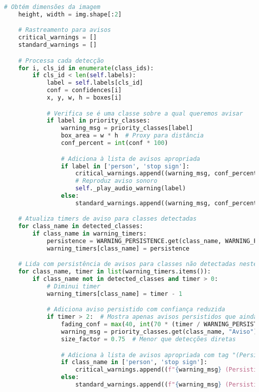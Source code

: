 \documentclass[
	12pt,				%
	oneside, %
	a4paper,			%
	english,			%
	french,				%
	spanish,			%
	brazil				%
	]{abntex2}
\begin{document}
\begin{apendicesenv}
\begin{lstlisting}[language=Python, caption=Implementação do sistema de \textit{feedback} visual., label=lst:add_warnings]
    # Obtém dimensões da imagem
    height, width = img.shape[:2]

    # Rastreamento para avisos
    critical_warnings = []
    standard_warnings = []

    # Processa cada detecção
    for i, cls_id in enumerate(class_ids):
        if cls_id < len(self.labels):
            label = self.labels[cls_id]
            conf = confidences[i]
            x, y, w, h = boxes[i]

            # Verifica se é uma classe sobre a qual queremos avisar
            if label in priority_classes:
                warning_msg = priority_classes[label]
                box_area = w * h  # Proxy para distância
                conf_percent = int(conf * 100)

                # Adiciona à lista de avisos apropriada
                if label in ['person', 'stop sign']:
                    critical_warnings.append((warning_msg, conf_percent, box_area, label))
                    # Reproduz aviso sonoro
                    self._play_audio_warning(label)
                else:
                    standard_warnings.append((warning_msg, conf_percent, box_area, label))

    # Atualiza timers de aviso para classes detectadas
    for class_name in detected_classes:
        if class_name in warning_timers:
            persistence = WARNING_PERSISTENCE.get(class_name, WARNING_PERSISTENCE['default'])
            warning_timers[class_name] = persistence

    # Lida com persistência de avisos para classes não detectadas neste frame
    for class_name, timer in list(warning_timers.items()):
        if class_name not in detected_classes and timer > 0:
            # Diminui timer
            warning_timers[class_name] = timer - 1

            # Adiciona aviso persistido com confiança reduzida
            if timer > 2:  # Mostra apenas avisos persistidos que ainda são relevantes
                fading_conf = max(40, int(70 * (timer / WARNING_PERSISTENCE.get(class_name, WARNING_PERSISTENCE['default']))))
                warning_msg = priority_classes.get(class_name, "Aviso")
                size_factor = 0.75  # Menor que detecções diretas

                # Adiciona à lista de avisos apropriada com tag "(Persistido)"
                if class_name in ['person', 'stop sign']:
                    critical_warnings.append((f"{warning_msg} (Persistido)", fading_conf, size_factor, class_name))
                else:
                    standard_warnings.append((f"{warning_msg} (Persistido)", fading_conf, size_factor, class_name))


\end{lstlisting}
\end{apendicesenv}
\end{document}
